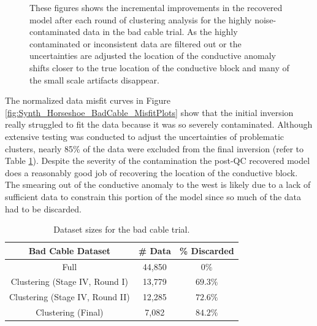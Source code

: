 \documentclass[final,authoryear,5p,times,twocolumn]{elsarticle}
\begin{document}
\begin{figure} [!ht]
\begin{center}
{       } %
    \end{center}
\caption{These figures shows the incremental improvements in the recovered model after each round of clustering analysis for the highly noise-contaminated data in the bad cable trial. As the highly contaminated or inconsistent data are filtered out or the uncertainties are adjusted the location of the conductive anomaly shifts closer to the true location of the conductive block and many of the small scale artifacts disappear.}
\label{fig:Synth_Horseshoe_BadCable}
\end{figure}

The normalized data misfit curves in Figure \ref{fig:Synth_Horseshoe_BadCable_MisfitPlots} show that the initial inversion really struggled to fit the data because it was so severely contaminated. Although extensive testing was conducted to adjust the uncertainties of problematic clusters, nearly 85\% of the data were excluded from the final inversion (refer to Table \ref{tab:Synth_BadCable_Sizes}). Despite the severity of the contamination the post-QC recovered model does a reasonably good job of recovering the location of the conductive block. The smearing out of the conductive anomaly to the west is likely due to a lack of sufficient data to constrain this portion of the model since so much of the data had to be discarded.

\begin{table}[!ht]
\small
\begin{center}
  \begin{tabular}{| c | c | c |}
    \hline
    \bf{Bad Cable Dataset} & \bf{\# Data} & \bf{\% Discarded}\\
    \hline
    Full & 44,850 & $0 \%$\\
    \hline
    Clustering (Stage IV, Round I) &  13,779 & $69.3 \%$\\
    \hline
    Clustering (Stage IV, Round II) & 12,285 & $72.6 \%$\\
    \hline
    Clustering (Final) & 7,082 & $84.2 \%$\\
    \hline
  \end{tabular}
\caption{Dataset sizes for the bad cable trial.}
\label{tab:Synth_BadCable_Sizes}
\end{center}
\end{table}
\end{document}
